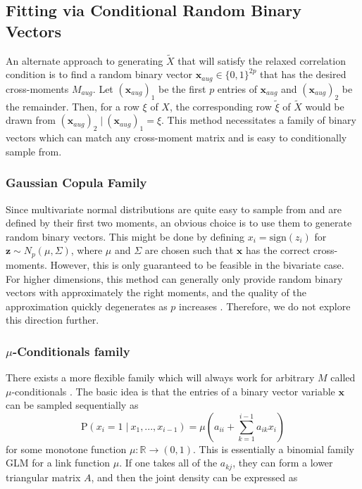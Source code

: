 \documentclass[11pt]{article}
\newcommand{\R}{\mathbb{R}}
\newcommand{\p}{\mathrm{P}}
\newcommand{\st}{ \; \big | \:}
\theoremstyle{definition}
\begin{document}
\subsection{Fitting via Conditional Random Binary Vectors }
An alternate approach to generating $\tilde X$ that will satisfy the relaxed correlation condition is to find a random binary vector $\mathbf{x}_{aug}\in\{0,1\}^{2p}$ that has the desired cross-moments $M_{aug}$. Let $(\mathbf{x}_{aug})_1$ be the first $p$ entries of $\mathbf{x}_{aug}$ and $(\mathbf{x}_{aug})_2$ be the remainder. Then, for a row $\xi$ of $X$, the corresponding row $\tilde \xi$ of $\tilde X$ would be drawn from $(\mathbf{x}_{aug})_2\st (\mathbf{x}_{aug})_1=\xi$. This method necessitates a family of binary vectors which can match any cross-moment matrix and is easy to conditionally sample from.


\subsubsection{Gaussian Copula Family}
Since multivariate normal distributions are quite easy to sample from and are defined by their first two moments, an obvious choice is to use them to generate random binary vectors. This might be done by defining $x_i = \mathrm{sign}(z_i)$ for $\mathbf z\sim N_p(\mu,\Sigma)$, where $\mu$ and $\Sigma$ are chosen such that $\mathbf x$ has the correct cross-moments. However, this is only guaranteed to be feasible in the bivariate case. For higher dimensions, this method can generally only provide random binary vectors with approximately the right moments, and the quality of the approximation quickly degenerates as $p$ increases \cite{2011arXiv1111.0576S}. Therefore, we do not explore this direction further.

\subsubsection{$\mu$-Conditionals family}
There exists a more flexible family which will always work for arbitrary $M$ called $\mu$-conditionals \cite{2011arXiv1111.0576S}. The basic idea is that the entries of a binary vector variable $\mathbf x$ can be sampled sequentially as 
    \[ \p(x_{i}=1\st x_{1},...,x_{i-1}) = \mu\left(a_{ii}+\sum_{k=1}^{i-1}a_{ik}x_i\right) \]
    for some monotone function $\mu:\R\to(0,1)$. This is essentially a binomial family GLM for a link function $\mu$. If one takes all of the $a_{kj}$, they can form a lower triangular matrix $A$, and then the joint density can be expressed as 
\end{document}

